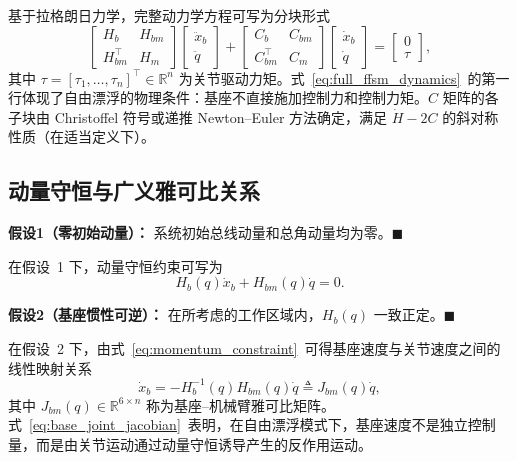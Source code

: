 基于拉格朗日力学，完整动力学方程可写为分块形式
\begin{equation}
\begin{bmatrix}
H_b & H_{bm}\\
H_{bm}^\top & H_m
\end{bmatrix}
\begin{bmatrix}\ddot x_b\\ \ddot q\end{bmatrix}
+
\begin{bmatrix}
C_b & C_{bm}\\
C_{bm}^\top & C_m
\end{bmatrix}
\begin{bmatrix}\dot x_b\\ \dot q\end{bmatrix}
=
\begin{bmatrix}0\\ \tau\end{bmatrix},
\label{eq:full_ffsm_dynamics}
\end{equation}
其中 \(\tau=[\tau_1,\ldots,\tau_n]^\top\in\mathbb R^n\) 为关节驱动力矩。式~\eqref{eq:full_ffsm_dynamics}~的第一行体现了自由漂浮的物理条件：基座不直接施加控制力和控制力矩。\(C\) 矩阵的各子块由 Christoffel 符号或递推 Newton--Euler 方法确定，满足 \(\dot H-2C\) 的斜对称性质（在适当定义下）。

\subsection{动量守恒与广义雅可比关系}

\noindent\textbf{假设1（零初始动量）：} 系统初始总线动量和总角动量均为零。\hfill\(\blacksquare\)

在假设~1 下，动量守恒约束可写为
\begin{equation}
H_b(q)\dot x_b + H_{bm}(q)\dot q = 0.
\label{eq:momentum_constraint}
\end{equation}

\noindent\textbf{假设2（基座惯性可逆）：} 在所考虑的工作区域内，\(H_b(q)\) 一致正定。\hfill\(\blacksquare\)

在假设~2 下，由式~\eqref{eq:momentum_constraint}~可得基座速度与关节速度之间的线性映射关系
\begin{equation}
\dot x_b = -H_b^{-1}(q)H_{bm}(q)\dot q \triangleq J_{bm}(q)\dot q,
\label{eq:base_joint_jacobian}
\end{equation}
其中 \(J_{bm}(q)\in\mathbb R^{6\times n}\) 称为基座--机械臂雅可比矩阵。式~\eqref{eq:base_joint_jacobian}~表明，在自由漂浮模式下，基座速度不是独立控制量，而是由关节运动通过动量守恒诱导产生的反作用运动。

